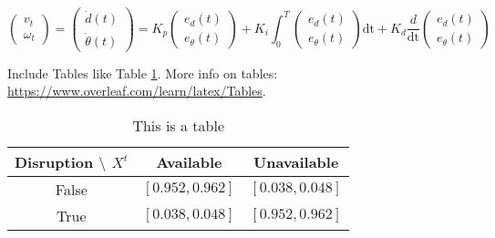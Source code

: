 \documentclass[a4paper, 12pt]{article}
\begin{document}
\begin{sloppypar}
\begin{equation} \renewcommand{\arraystretch}{1.8}
    \label{Chap3:Eq4}
    \begin{pmatrix}
        v_t \\ \omega_{t}
    \end{pmatrix}=
    \begin{pmatrix}
        \dot{d}(t) \\ \dot{\theta} (t)
    \end{pmatrix}= K_p \begin{pmatrix}
        e_d (t) \\e_{\theta} (t)
    \end{pmatrix} + K_i \int_{0}^{T} \begin{pmatrix}
        e_d (t) \\e_{\theta} (t)
    \end{pmatrix} \mathrm{dt} + K_d \frac{d}{\mathrm{dt}} \begin{pmatrix}
        e_d (t) \\e_{\theta} (t)
    \end{pmatrix}
\end{equation}

 
  
 



Include Tables like Table \ref{tab:table}. More info on tables: 
\url{https://www.overleaf.com/learn/latex/Tables}.
\begin{table}[h]
    \centering
    \begin{tabular}{c|cc}
    \hline
    Disruption $\setminus$ $X^t$ & Available &  Unavailable \\ \hline \hline
    False      & $[0.952, 0.962]$ & $[0.038, 0.048]$ \\
    True       & $[0.038, 0.048]$ & $[0.952, 0.962]$ \\ \hline
    \end{tabular}
    \caption{This is a table} 
    \label{tab:table}
\end{table}


\end{sloppypar}
\end{document}
